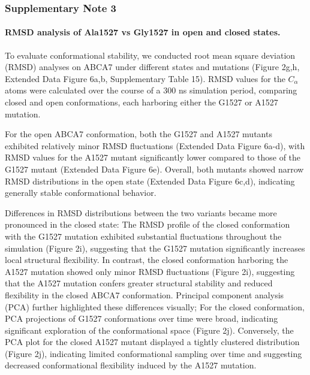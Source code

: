 
\subsubsection*{Supplementary Note 3}
\paragraph{RMSD analysis of Ala1527 vs Gly1527 in open and closed states.}
To evaluate conformational stability, we conducted root mean square deviation (RMSD) analyses on ABCA7 under different states and mutations (Figure 2g,h, Extended Data Figure 6a,b, Supplementary Table 15). RMSD values for the $C_\alpha$ atoms were calculated over the course of a 300 ns simulation period, comparing closed and open conformations, each harboring either the G1527 or A1527 mutation.

For the open ABCA7 conformation, both the G1527 and A1527 mutants exhibited relatively minor RMSD fluctuations (Extended Data Figure 6a-d), with RMSD values for the A1527 mutant significantly lower compared to those of the G1527 mutant (Extended Data Figure 6e). Overall, both mutants showed narrow RMSD distributions in the open state (Extended Data Figure 6c,d), indicating generally stable conformational behavior. 

Differences in RMSD distributions between the two variants became more pronounced in the closed state: The RMSD profile of the closed conformation with the G1527 mutation exhibited substantial fluctuations throughout the simulation (Figure 2i), suggesting that the G1527 mutation significantly increases local structural flexibility. In contrast, the closed conformation harboring the A1527 mutation showed only minor RMSD fluctuations (Figure 2i), suggesting that the A1527 mutation confers greater structural stability and reduced flexibility in the closed ABCA7 conformation. Principal component analysis (PCA) further highlighted these differences visually; For the closed conformation, PCA projections of G1527 conformations over time were broad, indicating significant exploration of the conformational space (Figure 2j). Conversely, the PCA plot for the closed A1527 mutant displayed a tightly clustered distribution (Figure 2j), indicating limited conformational sampling over time and suggesting decreased conformational flexibility induced by the A1527 mutation.

